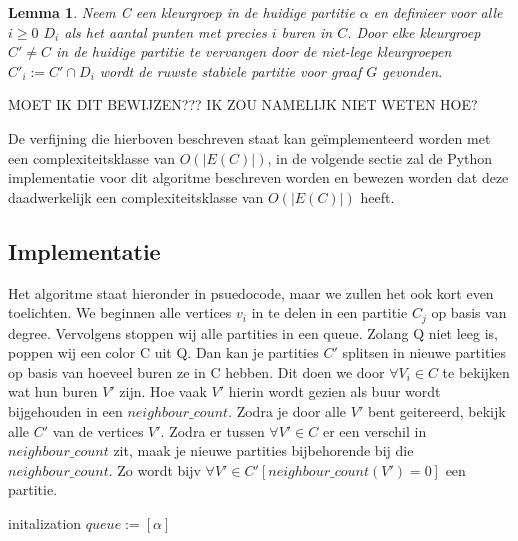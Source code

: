 \documentclass[twoside]{article}
\newtheorem{lemma}[theorem]{Lemma}
\begin{document}
\begin{multicols}{2}
\begin{lemma}
Neem C een kleurgroep in de huidige partitie $\alpha$ en definieer voor alle $i \geq 0$ $D_{i}$ als het aantal punten met precies $i$ buren in $C$. Door elke kleurgroep $C' \neq C$ in de huidige partitie te vervangen door de niet-lege kleurgroepen $C'_{i} := C'\cap D_{i}$ wordt de ruwste stabiele partitie voor graaf $G$ gevonden.
\end{lemma}

MOET IK DIT BEWIJZEN??? IK ZOU NAMELIJK NIET WETEN HOE?

De verfijning die hierboven beschreven staat kan ge\"implementeerd worden met een complexiteitsklasse van $O(|E(C)|)$, in de volgende sectie zal de Python implementatie voor dit algoritme beschreven worden en bewezen worden dat deze daadwerkelijk een complexiteitsklasse van $O(|E(C)|)$ heeft.

\subsection{Implementatie}
Het algoritme staat hieronder in psuedocode, maar we zullen het ook kort even toelichten. We beginnen alle vertices $v_i$ in te delen in een partitie $C_j$ op basis van degree. Vervolgens stoppen wij alle partities in een queue.
Zolang Q niet leeg is, poppen wij een color C uit Q. 
Dan kan je partities $ C' $ splitsen in nieuwe partities op basis van hoeveel buren ze in C hebben. Dit doen we door $ \forall V_i \in C $ te bekijken wat hun buren $V'$ zijn. Hoe vaak $V'$ hierin wordt  gezien als buur wordt bijgehouden in een $neighbour\_count$. Zodra je door alle $V'$ bent geitereerd, bekijk alle $C'$ van de vertices $V'$. Zodra er tussen $ \forall{V'} \in C $ er een verschil in $neighbour\_count$ zit, maak je nieuwe partities bijbehorende bij die $neighbour\_count$. Zo wordt bijv $ \forall V' \in C'  [ neighbour\_count(V') = 0] $ een partitie.

\begin{algorithm}[H]
initalization \;
 $queue := [\alpha]$\;
\end{algorithm}
\end{multicols}
\end{document}
